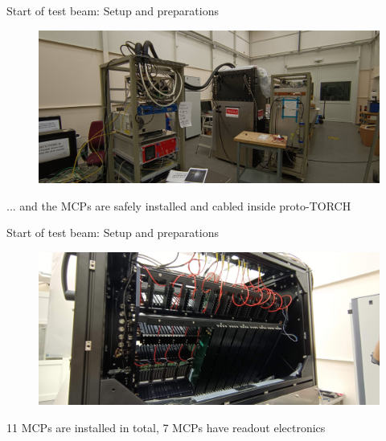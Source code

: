 \documentclass[xcolor = table]{beamer}
\begin{document}
\begin{frame}{Start of test beam: Setup and preparations}
  \begin{figure}
    \centering
    \includegraphics[width = 1.0\textwidth]{Plots/TORCH_lab.jpg}
  \end{figure}
  \vspace{-0.2cm}
  \begin{center}
    \large ... and the MCPs are safely installed and cabled inside proto-TORCH
  \end{center}
\end{frame}

\begin{frame}{Start of test beam: Setup and preparations}
  \begin{figure}
    \centering
    \includegraphics[width = 1.0\textwidth]{Plots/MCP_installation.jpg}
  \end{figure}
  \vspace{-0.2cm}
  \begin{center}
    \large 11 MCPs are installed in total, 7 MCPs have readout electronics
  \end{center}
\end{frame}
\end{document}
